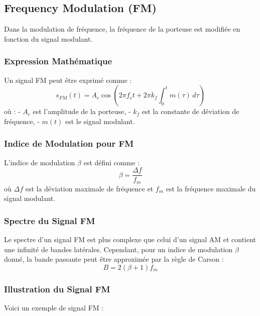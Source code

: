 \documentclass[10pt,a4paper]{article}
\begin{document}

\subsection*{Frequency Modulation (FM)}
Dans la modulation de fréquence, la fréquence de la porteuse est modifiée en fonction du signal modulant.

\subsubsection*{Expression Mathématique}
Un signal FM peut être exprimé comme :
\[ s_{FM}(t) = A_c \cos \left(2\pi f_c t + 2\pi k_f \int_{0}^{t} m(\tau) \, d\tau \right) \]
où :
- \( A_c \) est l'amplitude de la porteuse,
- \( k_f \) est la constante de déviation de fréquence,
- \( m(t) \) est le signal modulant.

\subsubsection*{Indice de Modulation pour FM}
L'indice de modulation \( \beta \) est défini comme :
\[ \beta = \frac{\Delta f}{f_m} \]
où \( \Delta f \) est la déviation maximale de fréquence et \( f_m \) est la fréquence maximale du signal modulant.

\subsubsection*{Spectre du Signal FM}
Le spectre d'un signal FM est plus complexe que celui d'un signal AM et contient une infinité de bandes latérales. Cependant, pour un indice de modulation \( \beta \) donné, la bande passante peut être approximée par la règle de Carson :
\[ B = 2(\beta + 1)f_m \]

\subsubsection*{Illustration du Signal FM}
Voici un exemple de signal FM :
\end{document}
